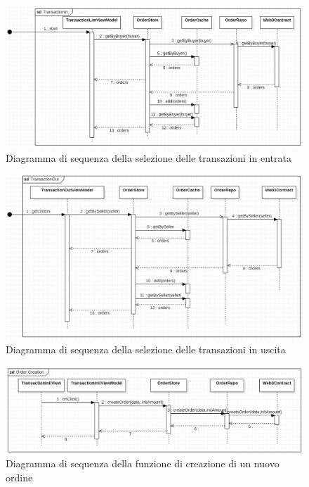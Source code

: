 \begin{landscape}
    \begin{figure}[H]
        \begin{center}
        \includegraphics[scale=0.7]{immagini/TransactionIn.png}
        \caption{Diagramma di sequenza della selezione delle transazioni in entrata}
        \end{center}
    \end{figure}
\end{landscape}

\begin{landscape}
    \begin{figure}[H]
        \begin{center}
        \includegraphics[scale=0.7]{immagini/TransactionOut.png}
        \caption{Diagramma di sequenza della selezione delle transazioni in uscita}
        \end{center}
    \end{figure}
\end{landscape}

\begin{figure}[H]
    \begin{center}
    \includegraphics[width=\textwidth]{immagini/ordercreation.png}
    \caption{Diagramma di sequenza della funzione di creazione di un nuovo ordine}
    \end{center}
\end{figure}

